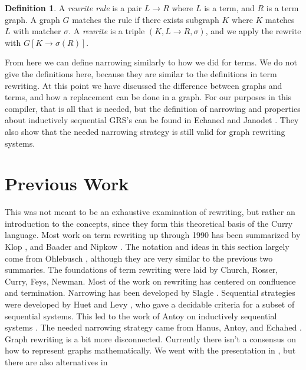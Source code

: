 \documentclass{book}
\theoremstyle{definition}
\newtheorem{definition}{Definition}[section]
\begin{document}
\theoremstyle{definition}
\begin{definition}
A \emph{rewrite rule} is a pair $L \to R$ where $L$ is a 
term, and $R$ is a term graph.
A graph $G$ matches the rule if there exists subgraph $K$
where $K$ matches $L$ with matcher $\sigma$.
A \emph{rewrite} is a triple $(K, L \to R, \sigma)$,
and we apply the rewrite with $G[K \to \sigma(R)]$.
\end{definition}


From here we can define narrowing similarly to how we did for terms.
We do not give the definitions here, because they are similar to the definitions
in term rewriting.
At this point we have discussed the difference between graphs and terms,
and how a replacement can be done in a graph.
For our purposes in this compiler, that is all that is needed,
but the definition of narrowing and properties about inductively sequential GRS's
can be found in Echaned and Janodet \cite{graphRewriting}.
They also show that the needed narrowing strategy is still valid for graph rewriting systems.

\section{Previous Work}
This was not meant to be an exhaustive examination of rewriting, but rather an introduction to the concepts,
since they form this theoretical basis of the Curry language.
Most work on term rewriting up through 1990 has been summarized by Klop \cite{termRewriting},
and Baader and Nipkow \cite{termAndAllThat}.
The notation and ideas in this section largely come from
Ohlebusch \cite{AdvancedTRS}, although they are very similar to the previous two summaries.
The foundations of term rewriting were laid by Church, Rosser, Curry, Feys, Newman. 
\cite{churchRosser, CombLogic, Newman}
Most of the work on rewriting has centered on confluence and termination. \cite{termRewriting}
Narrowing has been developed by Slagle \cite{narrowing}.
Sequential strategies were developed by Huet and Levy \cite{StrongSequential},
who gave a decidable criteria for a subset of sequential systems.
This led to the work of Antoy on inductively sequential systems \cite{DefinitionalTrees}.
The needed narrowing strategy came from Hanus, Antoy, and Echahed \cite{Needed}.
Graph rewriting is a bit more disconnected.  
Currently there isn't a consensus on how to represent graphs mathematically.
We went with the presentation in \cite{graphRewriting}, 
but there are also alternatives in \cite{termRewriting, termAndAllThat, AdvancedTRS}
\end{document}
